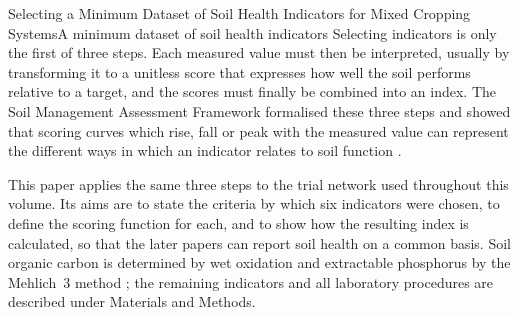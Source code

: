 \documentclass[../main.tex]{subfiles}
\begin{document}
\begin{paper}{Selecting a Minimum Dataset of Soil Health Indicators for Mixed Cropping Systems}{A minimum dataset of soil health indicators}
Selecting indicators is only the first of three steps. Each measured value
must then be interpreted, usually by transforming it to a unitless score that
expresses how well the soil performs relative to a target, and the scores must
finally be combined into an index. The Soil Management Assessment Framework
formalised these three steps and showed that scoring curves which rise, fall
or peak with the measured value can represent the different ways in which an
indicator relates to soil function \parencite{andrews2004}.

This paper applies the same three steps to the trial network used throughout
this volume. Its aims are to state the criteria by which six indicators were
chosen, to define the scoring function for each, and to show how the resulting
index is calculated, so that the later papers can report soil health on a
common basis. Soil organic carbon is determined by wet oxidation
\parencite{walkley1934} and extractable phosphorus by the Mehlich~3 method
\parencite{mehlich1984}; the remaining indicators and all laboratory procedures
are described under Materials and Methods.

\end{paper}
\end{document}
